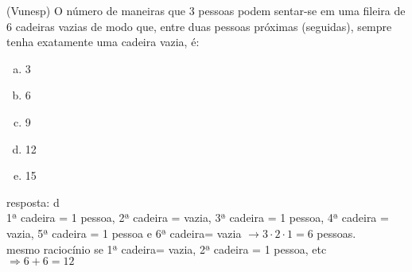 \begin{ex}
(Vunesp) O número de maneiras que 3 pessoas podem sentar-se em uma fileira de 6 cadeiras vazias de modo que, entre duas pessoas próximas (seguidas), sempre tenha exatamente uma cadeira vazia, é:
   \begin{enumerate}[(a)]
   \item 3
   \item 6
   \item 9
   \item 12
   \item 15
   \end{enumerate}
     \begin{sol}
         resposta: d \\
         1ª cadeira = 1 pessoa, 2ª cadeira = vazia, 3ª cadeira = 1 pessoa, 4ª cadeira = vazia, 5ª cadeira = 1 pessoa e 6ª cadeira= vazia $\rightarrow 3\cdot2\cdot1=6$ pessoas.\\
         mesmo raciocínio se 1ª cadeira= vazia, 2ª cadeira = 1 pessoa, etc \\
         $\Longrightarrow 6+6= 12 $
     \end{sol}
\end{ex}